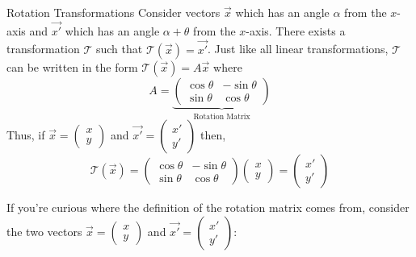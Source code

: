 \begin{defbox}{Rotation Transformations}{}
    Consider vectors $\vec{x}$ which has an angle $\alpha$ from the $x$-axis and $\vec{x'}$ which has an angle $\alpha + \theta$ from the $x$-axis. There exists a transformation $\mathcal{T}$ such that $\mathcal{T}(\vec{x}) = \vec{x'}$. Just like all linear transformations, $\mathcal{T}$ can be written in the form $\mathcal{T}\left(\vec{x}\right) = A\vec{x}$ where 
    \[A = \underbrace{\begin{pmatrix}
        \cos\theta & -\sin\theta \\ \sin\theta & \cos\theta
    \end{pmatrix}}_{\text{Rotation Matrix}}\]
    Thus, if $\vec{x} = \begin{pmatrix} x \\ y \end{pmatrix}$ and $\vec{x'} = \begin{pmatrix} x' \\ y' \end{pmatrix}$ then, 
    \[
        \mathcal{T}\left(\vec{x}\right) = 
        \begin{pmatrix}
            \cos\theta & -\sin\theta \\ \sin\theta & \cos\theta
        \end{pmatrix}
        \begin{pmatrix}
            x \\ y 
        \end{pmatrix}
        = 
        \begin{pmatrix}
            x' \\ y'
        \end{pmatrix}
    \]
\end{defbox}

If you're curious where the definition of the rotation matrix comes from, consider the two vectors $\vec{x} = \begin{pmatrix} x \\ y \end{pmatrix}$ and $\vec{x'} = \begin{pmatrix} x' \\ y' \end{pmatrix}$:

